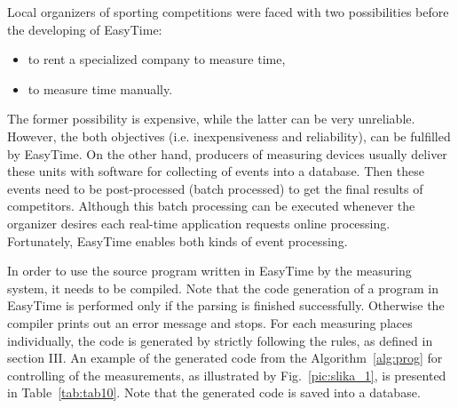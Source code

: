 \documentclass[preprint, prX]{revtex4}
\begin{document}
Local organizers of sporting competitions were faced with two possibilities before the developing of EasyTime:
\begin{itemize}
  \item to rent a specialized company to measure time,
  \item to measure time manually.
\end{itemize}
The former possibility is expensive, while the latter can be very unreliable. However, the both objectives (i.e. inexpensiveness and reliability), can be fulfilled by EasyTime. On the other hand, producers of measuring devices usually deliver these units with software for collecting of events into a database. Then these events need to be post-processed (batch processed) to get the final results of competitors. Although this batch processing can be executed whenever the organizer desires each real-time application requests online processing. Fortunately, EasyTime enables both kinds of event processing.

In order to use the source program written in EasyTime by the measuring system, it needs to be compiled. Note that the code
generation \cite{Aho:1972} of a program in EasyTime is performed only if the parsing is finished successfully. Otherwise the compiler
prints out an error message and stops. For each measuring places individually, the code is generated by strictly following the rules, as defined in section III. An example of the generated code from the Algorithm~\ref{alg:prog} for controlling of the measurements,
as illustrated by Fig.~\ref{pic:slika_1}, is presented in Table~\ref{tab:tab10}. Note that the generated code is saved
into a database.
\end{document}
